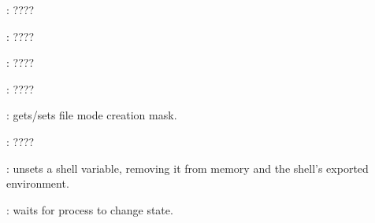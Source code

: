 \begin{compactenum}
\item [\symbolbash] : \dotfill ????

\item [\symbolbash] : \dotfill ????

\item [\symbolbash] : \dotfill ????

\item [\symbolbash] : \dotfill ????

\item [\symbolbash] : gets/sets file mode creation mask.

\item [\symbolbash] : \dotfill ????

\item [\symbolbash] : unsets a shell variable, removing it from memory and the shell's exported environment.

\item [\symbolbash] : waits for process to change state.
\end{compactenum}


